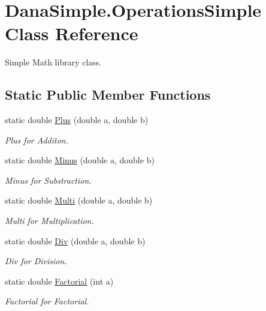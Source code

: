 \hypertarget{classDanaSimple_1_1OperationsSimple}{}\section{Dana\+Simple.\+Operations\+Simple Class Reference}
\label{classDanaSimple_1_1OperationsSimple}


Simple Math library class.  


\subsection*{Static Public Member Functions}
\begin{DoxyCompactItemize}
\item 
static double \hyperlink{classDanaSimple_1_1OperationsSimple_a4db87aef7a77f2c4f4060154c6329db9}{Plus} (double a, double b)
\begin{DoxyCompactList}\small\item\em Plus for Additon. \end{DoxyCompactList}\item 
static double \hyperlink{classDanaSimple_1_1OperationsSimple_aeedd88ce3743db60d0d5d18d86ae2e23}{Minus} (double a, double b)
\begin{DoxyCompactList}\small\item\em Minus for Substraction. \end{DoxyCompactList}\item 
static double \hyperlink{classDanaSimple_1_1OperationsSimple_a4894b899b1f8b881e6b44ebec8453151}{Multi} (double a, double b)
\begin{DoxyCompactList}\small\item\em Multi for Multiplication. \end{DoxyCompactList}\item 
static double \hyperlink{classDanaSimple_1_1OperationsSimple_a687d612438e1e8926213c86393d6949c}{Div} (double a, double b)
\begin{DoxyCompactList}\small\item\em Div for Division. \end{DoxyCompactList}\item 
static double \hyperlink{classDanaSimple_1_1OperationsSimple_ac93a09de0f6e8aa3d0eb36ad895e396a}{Factorial} (int a)
\begin{DoxyCompactList}\small\item\em Factorial for Factorial. \end{DoxyCompactList}\end{DoxyCompactItemize}



